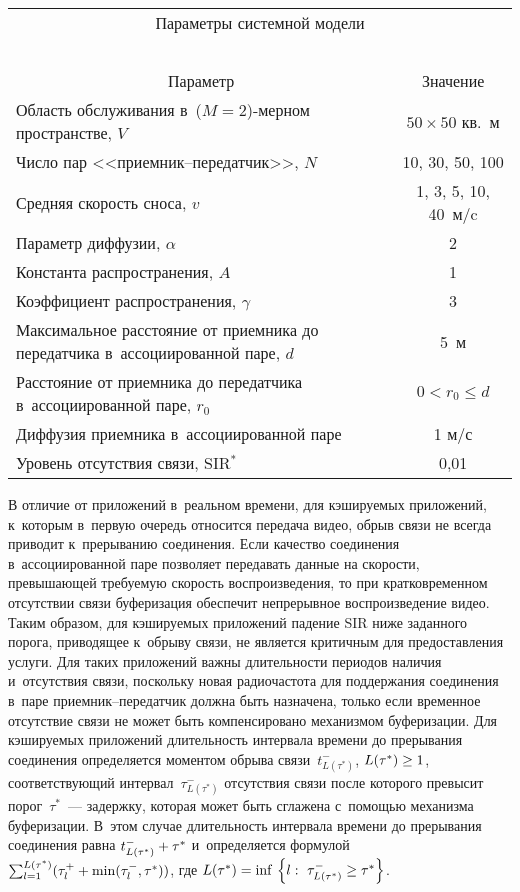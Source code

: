 \begin{multicols}{2}
  \begin{table*}[b]\small
  \begin{center}
 
  
  \begin{tabular}{|l|c|}
\multicolumn{2}{c}{Параметры системной модели}\\
\multicolumn{2}{c}{\ }\\[-6pt]
  \hline
\multicolumn{1}{|c|}{Параметр}&Значение\\
\hline
Область обслуживания в~($M=2$)-мер\-ном пространстве, $V$&$50\times50$ 
кв.\ м\\
Число пар <<приемник--передатчик>>, $N$&10, 30, 50, 100\\
Средняя скорость сноса, $v$&1, 3, 5, 10, 40~м/c\\
Параметр диффузии, $\alpha$&2\\
Константа распространения, $A$&1\\
Коэффициент распространения, $\gamma$&3\\
Максимальное расстояние от приемника до передатчика в~ассоциированной 
паре, $d$&5~м\\
Расстояние от приемника до передатчика в~ассоциированной паре, $r_0$&$0<r_0\leq 
d$\\
Диффузия приемника в~ассоциированной паре&1 м/с\\
Уровень отсутствия связи, SIR$^*$&0,01\\
\hline
\end{tabular}
\end{center}
\end{table*}

  
  В отличие от приложений в~реальном времени, для кэшируемых 
приложений, к~которым в~первую очередь относится передача видео, обрыв 
связи не всегда приводит к~прерыванию соединения. Если качество соединения 
в~ассоциированной паре позволяет передавать данные на скорости, 
превышающей требуемую скорость воспроизведения, то при кратковременном 
отсутствии связи буферизация обеспечит непрерывное воспроизведение видео. 
Таким образом, для кэшируемых приложений падение SIR ниже заданного 
порога, приводящее к~обрыву связи, не является критичным для 
предо\-став\-ле\-ния услуги. Для таких приложений важны длительности периодов 
наличия и~отсутствия связи, поскольку новая радиочастота для поддержания 
соединения в~паре при\-ем\-ник--пе\-ре\-дат\-чик должна быть назначена, 
только если временное отсутствие связи не может быть компенсировано\linebreak 
механизмом буферизации. Для кэшируемых приложений длительность 
интервала времени до прерывания соединения определяется моментом обрыва 
связи~$t^-_{L(\tau^*)}$, $L(\tau^*)\hm\geq 1$, соответст\-ву\-ющий 
интервал~$\tau^-_{L(\tau^*)}$ отсутствия связи после которого превысит 
порог~$\tau^*$~--- задержку, которая может быть сглажена с~помощью 
механизма буферизации. В~этом случае длительность интервала времени до 
прерывания соединения равна $t^-_{L(\tau^*)}\hm+\tau^*$ и~определяется 
формулой $\sum\nolimits_{l=1}^{L(\tau^*)} (\tau_l^+\hm+\min (\tau_l^-,\tau^*))$, 
где $L(\tau^*)\hm= \mathrm{inf}\, \left\{ l:\ \tau^-_{L(\tau^*)} \hm\geq 
\tau^*\right\}$.
  

\end{multicols}
